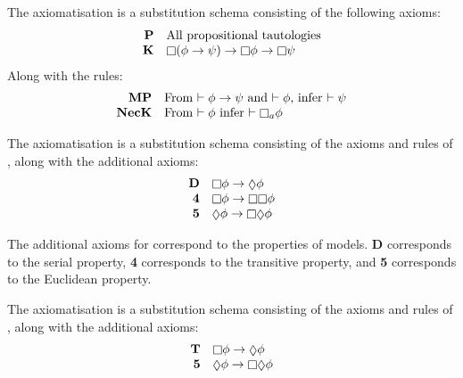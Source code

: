 \begin{definition}
The axiomatisation \axiomK{} is a substitution schema consisting of the
following axioms:
$$
\begin{array}{rl}
{\bf P} & \text{All propositional tautologies}\\
{\bf K} & \knows (\phi \implies \psi) \implies \knows \phi \implies \knows
\psi\\
\end{array}
$$
Along with the rules:
$$
\begin{array}{rl}
{\bf MP} & \text{From $\proves \phi \implies \psi$ and $\proves \phi$, infer
$\proves \psi$}\\
{\bf NecK} & \text{From $\proves \phi$ infer $\proves \knows_a \phi$}\\
\end{array}
$$
\end{definition}


\begin{definition}
The axiomatisation \axiomKD{} is a substitution schema consisting of the axioms
and rules of \axiomK{}, along with the additional axioms:
$$
\begin{array}{rl}
{\bf D} & \knows \phi \implies \suspects \phi\\
{\bf 4} & \knows \phi \implies \knows \knows \phi\\
{\bf 5} & \suspects \phi \implies \knows \suspects \phi\\
\end{array}
$$
\end{definition}

The additional axioms for \axiomKD{} correspond to the properties of \classKD{}
models. {\bf D} corresponds to the serial property, {\bf 4} corresponds to the
transitive property, and {\bf 5} corresponds to the Euclidean property.


\begin{definition}
The axiomatisation \axiomS{} is a substitution schema consisting of the axioms
and rules of \axiomK{}, along with the additional axioms:
$$
\begin{array}{rl}
{\bf T} & \knows \phi \implies \suspects \phi\\
{\bf 5} & \suspects \phi \implies \knows \suspects \phi\\
\end{array}
$$
\end{definition}

